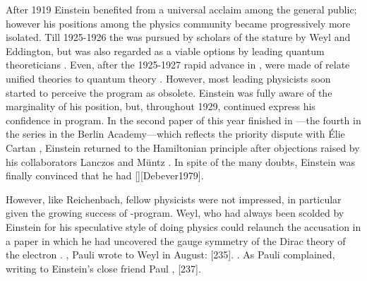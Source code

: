 \documentclass[draft]{article}
\newcommand{\FP}{\german{Fernparallelismus}\xspace}
\begin{document}
After 1919 Einstein benefited from a universal acclaim among the general public; however his positions among the physics community became progressively more isolated. Till 1925-1926 the \uftp was pursued by scholars of the stature by Weyl and Eddington, but was also regarded as a viable options by leading quantum theoreticians \citep[209]{Vizgin1994}. Even, after the 1925-1927 rapid advance in \qm, were made of relate unified theories to quantum theory \citep{Klein1926a}. However, most leading physicists  soon started to perceive the program as obsolete. Einstein was fully aware of the marginality of his position, but, throughout 1929, continued express his confidence in \FP program. In the second paper of this year finished in ---the fourth in the series in the Berlin Academy---which reflects the priority dispute with Élie Cartan \citep{Debever1979}, Einstein returned to the Hamiltonian principle after objections raised by his collaborators Lanczos and Müntz \citep{Einstein1930c}.  In spite of the many doubts, Einstein was finally convinced that he had  [][Debever1979].

However, like Reichenbach, fellow physicists were not impressed, in particular given the growing success of \qm-program. Weyl, who had always been scolded by Einstein for his speculative style of doing physics could relaunch the accusation in a paper \citep{Weyl1929c} in which he had uncovered the gauge symmetry of the Dirac theory of the electron . , Pauli wrote to Weyl in August:  [235].   \citep{Goldstein2003}. As Pauli complained, writing to Einstein's close friend Paul \Ehr,  [237].

\end{document}
